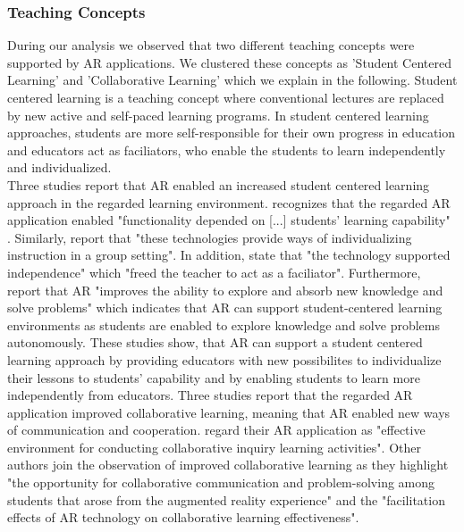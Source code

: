 \subsubsection{Teaching Concepts}
During our analysis we observed that two different teaching concepts were supported by AR applications. We clustered these concepts as 'Student Centered Learning' and 'Collaborative Learning' which we explain in the following.
Student centered learning is a teaching concept where conventional lectures are replaced by new active and self-paced learning programs. In student centered learning approaches, students are more self-responsible for their own progress in education and educators act as faciliators, who enable the students to learn independently and individualized.\\
Three studies report that AR enabled an increased student centered learning approach in the regarded learning environment. \cite{VateULan.2012} recognizes that the regarded AR application enabled "functionality depended on [...] students’ learning capability" \autocite [894]{VateULan.2012}. Similarly, \cite{Kamarainen.2013} report that "these technologies provide ways of individualizing instruction in a group setting".\autocite[554]{Kamarainen.2013} In addition, \cite{Kamarainen.2013} state that "the technology supported independence" which "freed the teacher to act as a faciliator".\autocite[554]{Kamarainen.2013} Furthermore, \cite{Liu.2009b} report that AR "improves the ability to explore and absorb new knowledge and solve problems" \autocite[173]{Liu.2009b} which indicates that AR can support student-centered learning environments as students are enabled to explore knowledge and solve problems autonomously. These studies show, that AR can support a student centered learning approach by providing educators with new possibilites to individualize their lessons to students' capability and by enabling students to learn more independently from educators.
Three studies report that the regarded AR application improved collaborative learning, meaning that AR enabled new ways of communication and cooperation. \cite{Wang.2012} regard their AR application as "effective environment for conducting collaborative inquiry learning activities". \autocite[57]{Wang.2012} Other authors join the observation of improved collaborative learning as they highlight "the opportunity for collaborative communication and problem-solving among students that arose from the augmented reality experience" \autocite[552]{Kamarainen.2013} and the "facilitation effects of AR technology on collaborative learning effectiveness".\autocite[322]{Li.2011}
% 
